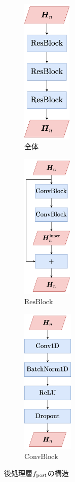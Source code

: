 \begin{figure}[tb]
    \centering
    \begin{subfigure}[b]{0.32\textwidth}
        \centering
        \includegraphics[height=70mm]{./figure/sec4/model_2/post.drawio.png}
        \caption{全体}
        \label{sec4:fig:post}
    \end{subfigure}
    \hfill
    \begin{subfigure}[b]{0.32\textwidth}
        \centering
        \includegraphics[height=70mm]{./figure/sec4/model_2/post_resblock.drawio.png}
        \caption{$\text{ResBlock}$}
        \label{sec4:fig:post_resblock}
    \end{subfigure}
    \hfill
    \begin{subfigure}[b]{0.32\textwidth}
        \centering
        \includegraphics[height=70mm]{./figure/sec4/model_2/post_convblock.drawio.png}
        \caption{$\text{ConvBlock}$}
        \label{sec4:fig:post_convblock}
    \end{subfigure}
    \caption{後処理層$f_{\text{post}}$の構造}
    \label{sec4:fig:post_three_step}
\end{figure}

